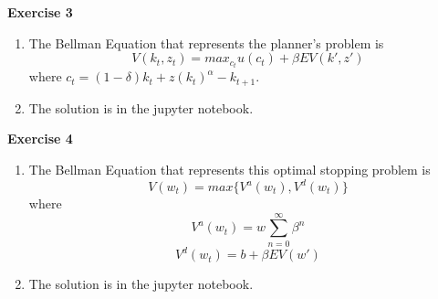 \documentclass[letterpaper,12pt]{article}
\theoremstyle{definition}
\begin{document}
  \noindent\textbf{Exercise 3}
  \begin{enumerate}
  \item The Bellman Equation that represents the planner's problem is \[V(k_t, z_t) = max_{c_t} u(c_t) + \beta E V(k', z')\] where $c_t = (1 - \delta) k_t + z(k_t)^\alpha - k_{t+1}$.
  \item The solution is in the jupyter notebook.
  \end{enumerate}
  
  \noindent\textbf{Exercise 4}
  \begin{enumerate}
  \item The Bellman Equation that represents this optimal stopping problem is \[V(w_t) = max\{V^a(w_t), V^d(w_t)\}\] where \[V^a(w_t) = w \sum_{n = 0}^\infty \beta^n\] \[V^d(w_t) = b + \beta E V(w')\]
  \item The solution is in the jupyter notebook.
  \end{enumerate}
  
  
\end{document}
